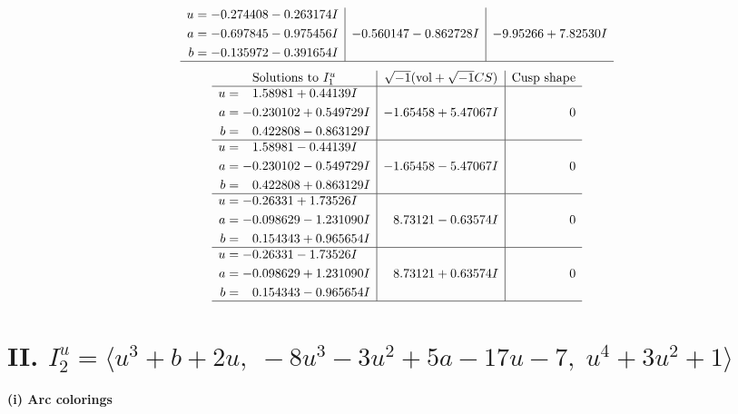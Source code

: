 \documentclass[1p]{elsarticle_modified}
\theoremstyle{definition}
\newcommand{\I}{\sqrt{-1}}
\begin{document}
$$\begin{array}{c|c|c}
\begin{aligned}
u &= -0.274408 - 0.263174 I \\
a &= -0.697845 - 0.975456 I \\
b &= -0.135972 - 0.391654 I\end{aligned}
 & -0.560147 - 0.862728 I & -9.95266 + 7.82530 I\\
 \hline 
 \end{array}$$\newpage$$\begin{array}{c|c|c}  
\text{Solutions to }I^u_{1}& \I (\text{vol} + \sqrt{-1}CS) & \text{Cusp shape}\\
 \hline 
\begin{aligned}
u &= \phantom{-}1.58981 + 0.44139 I \\
a &= -0.230102 + 0.549729 I \\
b &= \phantom{-}0.422808 - 0.863129 I\end{aligned}
 & -1.65458 + 5.47067 I & \phantom{-0.000000 } 0 \\ \hline\begin{aligned}
u &= \phantom{-}1.58981 - 0.44139 I \\
a &= -0.230102 - 0.549729 I \\
b &= \phantom{-}0.422808 + 0.863129 I\end{aligned}
 & -1.65458 - 5.47067 I & \phantom{-0.000000 } 0 \\ \hline\begin{aligned}
u &= -0.26331 + 1.73526 I \\
a &= -0.098629 - 1.231090 I \\
b &= \phantom{-}0.154343 + 0.965654 I\end{aligned}
 & \phantom{-}8.73121 - 0.63574 I & \phantom{-0.000000 } 0 \\ \hline\begin{aligned}
u &= -0.26331 - 1.73526 I \\
a &= -0.098629 + 1.231090 I \\
b &= \phantom{-}0.154343 - 0.965654 I\end{aligned}
 & \phantom{-}8.73121 + 0.63574 I & \phantom{-0.000000 } 0\\
 \hline 
 \end{array}$$\newpage\newpage\renewcommand{\arraystretch}{1}
\centering \section*{II. $I^u_{2}= \langle u^3+b+2 u,\;-8 u^3-3 u^2+5 a-17 u-7,\;u^4+3 u^2+1 \rangle$}
\flushleft \textbf{(i) Arc colorings}\\
\end{document}

